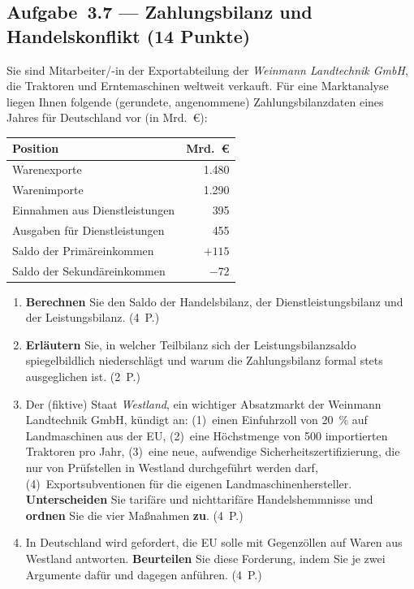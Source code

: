 \subsection*{Aufgabe~3.7 --- Zahlungsbilanz und Handelskonflikt (14 Punkte)}

Sie sind Mitarbeiter/-in der Exportabteilung der \emph{Weinmann Landtechnik GmbH}, die
Traktoren und Erntemaschinen weltweit verkauft. Für eine Marktanalyse liegen Ihnen
folgende (gerundete, angenommene) Zahlungsbilanzdaten eines Jahres für Deutschland vor
(in Mrd.~€):

\begin{center}
\begin{tabular}{lr}
\toprule
\textbf{Position} & \textbf{Mrd.~€}\\
\midrule
Warenexporte & 1.480\\
Warenimporte & 1.290\\
Einnahmen aus Dienstleistungen & 395\\
Ausgaben für Dienstleistungen & 455\\
Saldo der Primäreinkommen & $+115$\\
Saldo der Sekundäreinkommen & $-72$\\
\bottomrule
\end{tabular}
\end{center}

\begin{enumerate}[label=\alph*)]
  \item \textbf{Berechnen} Sie den Saldo der Handelsbilanz, der Dienstleistungsbilanz und
    der Leistungsbilanz. \hfill (4~P.)
  \item \textbf{Erläutern} Sie, in welcher Teilbilanz sich der Leistungsbilanzsaldo
    spiegelbildlich niederschlägt und warum die Zahlungsbilanz formal stets ausgeglichen
    ist. \hfill (2~P.)
  \item Der (fiktive) Staat \emph{Westland}, ein wichtiger Absatzmarkt der Weinmann
    Landtechnik GmbH, kündigt an: (1)~einen Einfuhrzoll von 20~\% auf Landmaschinen aus
    der EU, (2)~eine Höchstmenge von 500 importierten Traktoren pro Jahr, (3)~eine neue,
    aufwendige Sicherheitszertifizierung, die nur von Prüfstellen in Westland
    durchgeführt werden darf, (4)~Exportsubventionen für die eigenen
    Landmaschinenhersteller. \textbf{Unterscheiden} Sie tarifäre und nichttarifäre
    Handelshemmnisse und \textbf{ordnen} Sie die vier Maßnahmen \textbf{zu}. \hfill (4~P.)
  \item In Deutschland wird gefordert, die EU solle mit Gegenzöllen auf Waren aus Westland
    antworten. \textbf{Beurteilen} Sie diese Forderung, indem Sie je zwei Argumente dafür
    und dagegen anführen. \hfill (4~P.)
\end{enumerate}


